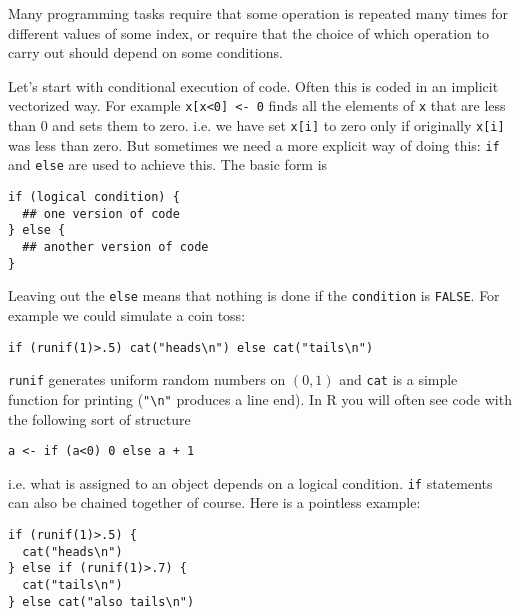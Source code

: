 \documentclass[10pt] {article}
\theoremstyle{definition}
\begin{document}
Many programming tasks require that some operation is repeated many times for different values of some index, or require that the choice of which operation to carry out should depend on some conditions.

Let's start with conditional execution of code. Often this is coded in an implicit vectorized way. For example \lstinline+x[x<0] <- 0+ finds all the elements of \lstinline+x+ that are less than 0 and sets them to zero. i.e. we have set \lstinline+x[i]+ to zero only if originally \lstinline+x[i]+ was less than zero. But sometimes we need a more explicit way of doing this: {\tt if} and {\tt else} are used to achieve this. The basic form is  
\begin{lstlisting}
if (logical condition) {
  ## one version of code
} else {
  ## another version of code
}
\end{lstlisting}  
Leaving out the {\tt else} means that nothing is done if the {\tt condition} is {\tt FALSE}. For example we could simulate a coin toss:
\begin{lstlisting}
if (runif(1)>.5) cat("heads\n") else cat("tails\n")
\end{lstlisting}
{\tt runif} generates uniform random numbers on $(0,1)$ and {\tt cat} is a simple function for printing (\lstinline+"\n"+ produces a line end). In R you will often see code with the following sort of structure
\begin{lstlisting}
a <- if (a<0) 0 else a + 1
\end{lstlisting}
i.e. what is assigned to an object depends on a logical condition. {\tt if} statements can also be chained together of course. Here is a pointless example:
\begin{lstlisting}
if (runif(1)>.5) {
  cat("heads\n")
} else if (runif(1)>.7) {
  cat("tails\n")
} else cat("also tails\n")
\end{lstlisting}
\end{document}
